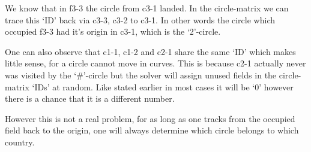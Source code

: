 We know that in f3-3 the circle from c3-1 landed. In the circle-matrix we can trace this `ID' back via c3-3, c3-2 to c3-1. In other words the circle which occupied f3-3 had it's origin in c3-1, which is the `2'-circle.

One can also observe that c1-1, c1-2 and c2-1 share the same `ID' which makes little sense, for a circle cannot move in curves. This is because c2-1 actually never was visited by the `\#'-circle but the solver will assign unused fields in the circle-matrix `IDs' at random. Like stated earlier in most cases it will be `0' however there is a chance that it is a different number.

However this is not a real problem, for as long as one tracks from the occupied field back to the origin, one will always determine which circle belongs to which country.


